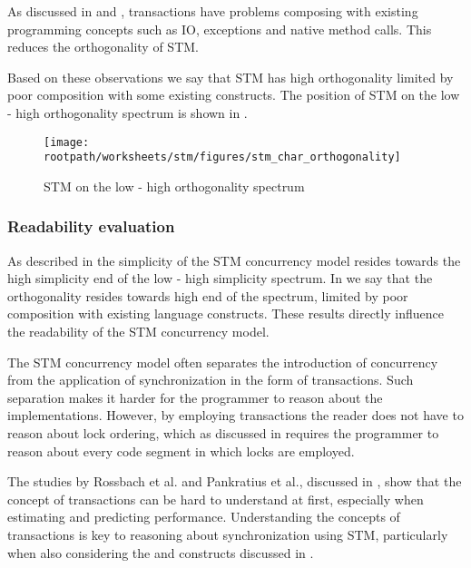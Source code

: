 As discussed in  and , transactions have problems composing with existing programming concepts such as \ac{IO}, exceptions and native method calls. This reduces the orthogonality of \ac{STM}.


Based on these observations we say that \ac{STM} has high orthogonality limited by poor composition with some existing constructs. The position of \ac{STM} on the low - high orthogonality spectrum is shown in .

\begin{figure}[htbp]
\centering
 \texttt{[image: \\rootpath/worksheets/stm/figures/stm\_char\_orthogonality]} 
 \caption{\ac{STM} on the low - high orthogonality spectrum}
\label{fig:char_stm_orthogonality}
\end{figure}

\subsubsection{Readability evaluation}
As described in  the simplicity of the \ac{STM} concurrency model resides towards the high simplicity end of the low - high simplicity spectrum. In  we say that the orthogonality resides towards high end of the spectrum, limited by poor composition with existing language constructs. These results directly influence the readability of the \ac{STM} concurrency model.

The \ac{STM} concurrency model often separates the introduction of concurrency from the application of synchronization in the form of transactions. Such separation makes it harder for the programmer to reason about the implementations. However, by employing transactions the reader does not have to reason about lock ordering, which as discussed in  requires the programmer to reason about every code segment in which locks are employed.

The studies by Rossbach et al. and Pankratius et al., discussed in , show that the concept of transactions can be hard to understand at first, especially when estimating and predicting performance. Understanding the concepts of transactions is key to reasoning about synchronization using \ac{STM}, particularly when also considering the  and  constructs discussed in .

